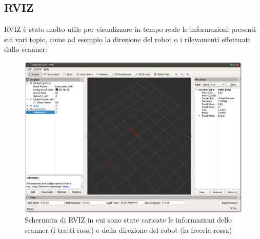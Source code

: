 \documentclass[Lau, binding=0.6cm, oneside]{sapthesis}
\begin{document}
\subsection{RVIZ}
RVIZ è stato molto utile per visualizzare in tempo reale le informazioni presenti sui vari topic, come ad esempio la direzione del robot o i rilevamenti effettuati dallo scanner:

\begin{figure}[H]
    \centering
    \includegraphics[width=13cm]{rviz.png}
    \caption{Schermata di RVIZ in cui sono state caricate le informazioni dello scanner (i tratti rossi) e della direzione del robot (la freccia rossa)}
    \label{fig:rviz}
\end{figure}
\end{document}
